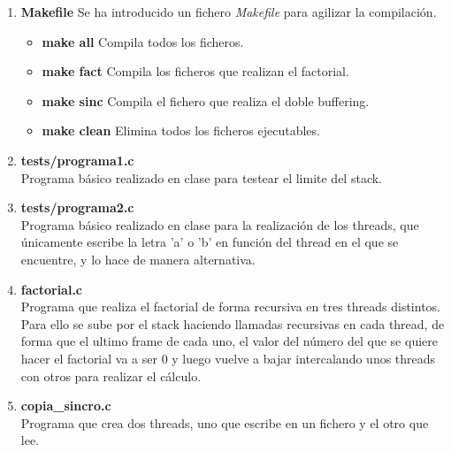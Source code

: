 \documentclass[12pt,a4paper,helvetica,titlepage]{article}
\begin{document}
\begin{enumerate}

    \item \textbf{Makefile} \label{pre0}
Se ha introducido un fichero \emph{Makefile} para agilizar la compilación. 

      \begin{itemize}

	  \item \textbf{make all}
	  Compila todos los ficheros.

          \item \textbf{make fact}
          Compila los ficheros que realizan el factorial.

          \item \textbf{make sinc}
	  Compila el fichero que realiza el doble buffering.

          \item \textbf{make clean}
	  Elimina todos los ficheros ejecutables.

      \end{itemize}

  \item \textbf{tests/programa1.c} \label{pre1}
  \\
Programa básico realizado en clase para testear el limite del stack.

  \item \textbf{tests/programa2.c} \label{pre2}
  \\
Programa básico realizado en clase para la realización de los threads, que únicamente 
escribe la letra 'a' o 'b' en función del thread en el que se encuentre, y lo hace de 
manera alternativa.

  \item \textbf{factorial.c} \label{pre3} 
  \\
Programa que realiza el factorial de forma recursiva en tres threads distintos. 
Para ello se sube por el stack haciendo llamadas recursivas en cada thread, de forma que 
el ultimo frame de cada uno, el valor del número del que se quiere hacer el factorial va a 
ser 0 y luego vuelve a bajar intercalando unos threads con otros para realizar el cálculo.

    \item \textbf{copia\_sincro.c} \label{pre4} 
	\\
Programa que crea dos threads, uno que escribe en un fichero y el otro que lee.

  \end{enumerate}
\end{document}
